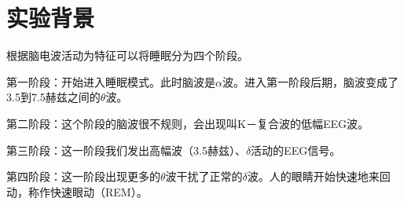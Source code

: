 \section{实验背景}

根据脑电波活动为特征可以将睡眠分为四个阶段。

第一阶段：开始进入睡眠模式。此时脑波是$\alpha$波。进入第一阶段后期，脑波变成了3.5到7.5赫兹之间的$\theta$波。

第二阶段：这个阶段的脑波很不规则，会出现叫K－复合波的低幅EEG波。

第三阶段：这一阶段我们发出高幅波（3.5赫兹）、$\delta$活动的EEG信号。

第四阶段：这一阶段出现更多的$\theta$波干扰了正常的$\delta$波。人的眼睛开始快速地来回动，称作快速眼动（REM）。